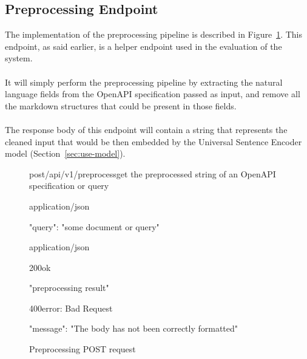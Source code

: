 \subsection{Preprocessing Endpoint}\label{subsec:preprocessing-endpoint}
The implementation of the preprocessing pipeline is described in Figure~\ref{fig:preprocessing-request}.
This endpoint, as said earlier, is a helper endpoint used in the evaluation of the system. \\ \\
It will simply perform the preprocessing pipeline by extracting the natural language fields from the OpenAPI specification passed as input, and remove all the markdown structures that could be present in those fields. \\ \\
The response body of this endpoint will contain a string that represents the cleaned input that would be then embedded by the Universal Sentence Encoder model (Section~\ref{sec:use-model}).

\begin{figure}[!h]
    \begin{apiRoute}{post}{/api/v1/preprocess}{get the preprocessed string of an OpenAPI specification or query}
        \begin{routeParameter}
        \end{routeParameter}

        \begin{routeRequest}{application/json}
            \begin{routeRequestBody}
{
    "query": "some document or query"
}
            \end{routeRequestBody}
        \end{routeRequest}

        \begin{routeResponse}{application/json}
            \begin{routeResponseItem}{200}{ok}
                \begin{routeResponseItemBody}
"preprocessing result"
                \end{routeResponseItemBody}
            \end{routeResponseItem}

            \begin{routeResponseItem}{400}{error: Bad Request}
                \begin{routeResponseItemBody}
{
    "message": "The body has not been correctly formatted"
}
                \end{routeResponseItemBody}
            \end{routeResponseItem}
        \end{routeResponse}
    \end{apiRoute}

    \caption{Preprocessing POST request}
    \label{fig:preprocessing-request}
\end{figure}

